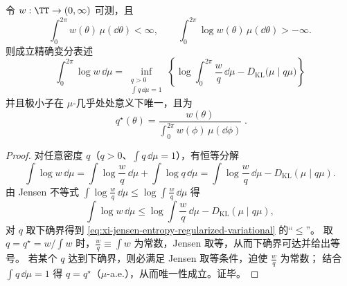 \begin{theorem}\label{thm:xi-jensen-entropy-regularized-variational}
令 \(w:\TT\to(0,\infty)\) 可测，且
\[
\int_{0}^{2\pi} w(\theta)\,\mu(\dd\theta)<\infty,
\qquad
\int_{0}^{2\pi}\log w(\theta)\,\mu(\dd\theta)>-\infty.
\]
则成立精确变分表述
\begin{equation}\label{eq:xi-jensen-entropy-regularized-variational}
\boxed{\;
\int_{0}^{2\pi}\log w\,\dd\mu
=\inf_{\substack{q>0\\ \int q\,\dd\mu=1}}
\left\{\log\!\int_{0}^{2\pi}\frac{w}{q}\,\dd\mu
-D_{\mathrm{KL}}\!\bigl(\mu\mid q\mu\bigr)\right\}\;}
\end{equation}
并且极小子在 \(\mu\)-几乎处处意义下唯一，且为
\begin{equation}\label{eq:xi-jensen-entropy-regularized-variational-minimizer}
\boxed{\;q^\star(\theta)=\frac{w(\theta)}{\int_{0}^{2\pi}w(\phi)\,\mu(\dd\phi)}\; }.
\end{equation}
\end{theorem}

\begin{proof}
对任意密度 \(q\)（\(q>0\)、\(\int q\,\dd\mu=1\)），有恒等分解
\[
\int\log w\,\dd\mu
=\int\log\frac{w}{q}\,\dd\mu+\int\log q\,\dd\mu
=\int\log\frac{w}{q}\,\dd\mu-D_{\mathrm{KL}}(\mu\mid q\mu).
\]
由 Jensen 不等式
\(
\int\log\frac{w}{q}\,\dd\mu\le \log\int\frac{w}{q}\,\dd\mu
\)
得
\[
\int\log w\,\dd\mu\le
\log\!\int\frac{w}{q}\,\dd\mu-D_{\mathrm{KL}}(\mu\mid q\mu),
\]
对 \(q\) 取下确界得到 \eqref{eq:xi-jensen-entropy-regularized-variational} 的“\(\le\)”。
取 \(q=q^\star=w/\int w\) 时，\(\frac{w}{q}\equiv \int w\) 为常数，Jensen 取等，从而下确界可达并给出等号。
若某个 \(q\) 达到下确界，则必满足 Jensen 取等条件，迫使 \(\frac{w}{q}\) 为常数；
结合 \(\int q\,\dd\mu=1\) 得 \(q=q^\star\)（\(\mu\)-a.e.），从而唯一性成立。证毕。
\end{proof}

